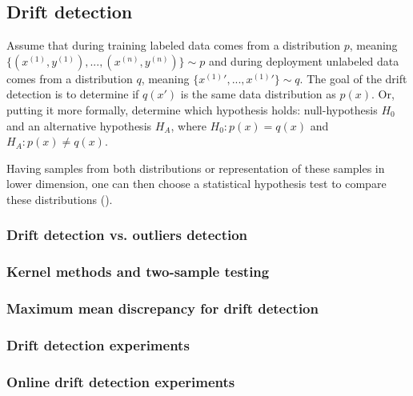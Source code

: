 \subsection{Drift detection}
    Assume that during training labeled data comes from a distribution $p$, meaning $\{(x^{(1)}, y^{(1)}), ..., (x^{(n)}, y^{(n)})\} \sim p$ and during deployment unlabeled data comes from a distribution $q$, meaning $\{x^{(1)}\prime, ..., x^{(1)}\prime\} \sim q$. The goal of the drift detection is to determine if $q(x\prime)$ is the same data distribution as $p(x)$. Or, putting it more formally, determine which hypothesis holds: null-hypothesis $H_0$ and an alternative hypothesis $H_A$, where $H_0:p(x) = q(x)$ and $H_A:p(x) \neq q(x)$.

    Having samples from both distributions or representation of these samples in lower dimension, one can then choose a statistical hypothesis test to compare these distributions (\cite{Muandet_2017}).
    \subsubsection{Drift detection vs. outliers detection}
        
    \subsubsection{Kernel methods and two-sample testing}
        
    \subsubsection{Maximum mean discrepancy for drift detection}
        
    \subsubsection{Drift detection experiments}
        
    \subsubsection{Online drift detection experiments}
            
